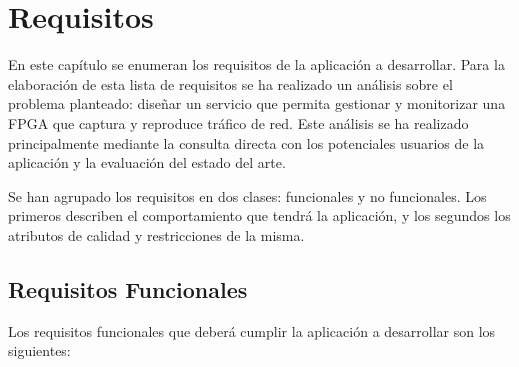 \chapter{Requisitos\label{cap:requisitos}}

En este capítulo se enumeran los requisitos de la aplicación a desarrollar.
Para la elaboración de esta lista de requisitos se ha realizado un análisis sobre el problema planteado: diseñar un servicio que permita gestionar y monitorizar una \gls{FPGA} que captura y reproduce tráfico de red.
Este análisis se ha realizado principalmente mediante la consulta directa con los potenciales usuarios de la aplicación y la evaluación del estado del arte.

Se han agrupado los requisitos en dos clases: funcionales y no funcionales.
Los primeros describen el comportamiento que tendrá la aplicación, y los segundos los atributos de calidad y restricciones de la misma.


\section{Requisitos Funcionales\label{sec:req:rf}}

Los requisitos funcionales que deberá cumplir la aplicación a desarrollar son los siguientes:

